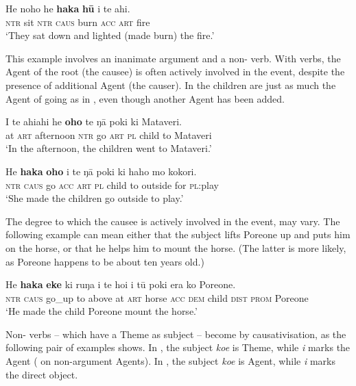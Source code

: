 \ea\label{ex:8.222}
\gll He noho he \textbf{haka} \textbf{hū} i te ahi. \\
\textsc{ntr} sit \textsc{ntr} \textsc{caus} burn \textsc{acc} \textsc{art} fire \\

\glt
‘They sat down and lighted (made burn) the fire.’ \textstyleExampleref{[R178.016]} 
\z

This example involves an inanimate argument and a non- verb. With  verbs, the Agent of the root (the causee) is often actively involved in the event, despite the presence of additional Agent (the causer). In  the children are just as much the Agent of going as in , even though another Agent has been added.

\ea\label{ex:8.223}
\gll {\ꞌ}I te ahiahi he \textbf{oho} te ŋā poki ki Mataveri.\\
at \textsc{art} afternoon \textsc{ntr} go \textsc{art} \textsc{pl} child to Mataveri\\

\glt 
‘In the afternoon, the children went to Mataveri.’ \textstyleExampleref{[R159.015]} 
\z

\ea\label{ex:8.224}
\gll He \textbf{haka} \textbf{oho} i te ŋā poki ki haho mo kokori. \\
\textsc{ntr} \textsc{caus} go \textsc{acc} \textsc{art} \textsc{pl} child to outside for \textsc{pl}:play \\

\glt
‘She made the children go outside to play.’ \textstyleExampleref{[R236.013]} 
\z

The degree to which the causee is actively involved in the event, may vary. The following example can mean either that the subject lifts Poreone up and puts him on the horse, or that he helps him to mount the horse. (The latter is more likely, as Poreone happens to be about ten years old.)

\ea\label{ex:8.225}
\gll He \textbf{haka} \textbf{eke} ki ruŋa i te hoi i tū poki era ko Poreone. \\
\textsc{ntr} \textsc{caus} go\_up to above at \textsc{art} horse \textsc{acc} \textsc{dem} child \textsc{dist} \textsc{prom} Poreone \\

\glt 
‘He made the child Poreone mount the horse.’ \textstyleExampleref{[R105.095]} 
\z

Non- verbs – which have a Theme as subject – become  by causativisation, as the following pair of examples shows. In , the subject \textit{koe} is Theme, while \textit{i} marks the Agent ( on non-argument Agents). In , the subject \textit{koe} is Agent, while \textit{i} marks the direct object.

